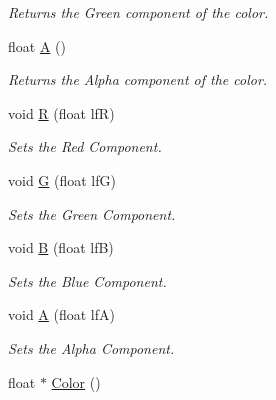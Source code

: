 \begin{DoxyCompactItemize}
\begin{DoxyCompactList}\small\item\em Returns the Green component of the color. \end{DoxyCompactList}\item 
\hypertarget{classc_r_g_b_a_a2d3cd53de12cb0fc8a7d5fbf6806058d}{
float \hyperlink{classc_r_g_b_a_a2d3cd53de12cb0fc8a7d5fbf6806058d}{A} ()}
\label{classc_r_g_b_a_a2d3cd53de12cb0fc8a7d5fbf6806058d}

\begin{DoxyCompactList}\small\item\em Returns the Alpha component of the color. \end{DoxyCompactList}\item 
\hypertarget{classc_r_g_b_a_a1fd2947185f01b4511e201ff532681df}{
void \hyperlink{classc_r_g_b_a_a1fd2947185f01b4511e201ff532681df}{R} (float lfR)}
\label{classc_r_g_b_a_a1fd2947185f01b4511e201ff532681df}

\begin{DoxyCompactList}\small\item\em Sets the Red Component. \end{DoxyCompactList}\item 
\hypertarget{classc_r_g_b_a_a9984d1f717f90c017a1ef4ad4f258fc4}{
void \hyperlink{classc_r_g_b_a_a9984d1f717f90c017a1ef4ad4f258fc4}{G} (float lfG)}
\label{classc_r_g_b_a_a9984d1f717f90c017a1ef4ad4f258fc4}

\begin{DoxyCompactList}\small\item\em Sets the Green Component. \end{DoxyCompactList}\item 
\hypertarget{classc_r_g_b_a_a147f72164155599d19dd7a265393c55f}{
void \hyperlink{classc_r_g_b_a_a147f72164155599d19dd7a265393c55f}{B} (float lfB)}
\label{classc_r_g_b_a_a147f72164155599d19dd7a265393c55f}

\begin{DoxyCompactList}\small\item\em Sets the Blue Component. \end{DoxyCompactList}\item 
\hypertarget{classc_r_g_b_a_ab1e15c350f6ea6e8a53780e847179cf4}{
void \hyperlink{classc_r_g_b_a_ab1e15c350f6ea6e8a53780e847179cf4}{A} (float lfA)}
\label{classc_r_g_b_a_ab1e15c350f6ea6e8a53780e847179cf4}

\begin{DoxyCompactList}\small\item\em Sets the Alpha Component. \end{DoxyCompactList}\item 
\hypertarget{classc_r_g_b_a_a2a3ea2dda2ee1081011795f650955370}{
float $\ast$ \hyperlink{classc_r_g_b_a_a2a3ea2dda2ee1081011795f650955370}{Color} ()}
\label{classc_r_g_b_a_a2a3ea2dda2ee1081011795f650955370}


\end{DoxyCompactItemize}
